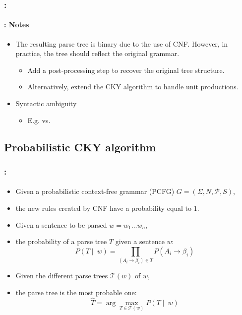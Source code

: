 \documentclass[xcolor=table]{beamer}
\begin{document}
\begin{frame}
	\frametitle{\insertshortsubtitle: \insertsection}
	\framesubtitle{\insertsubsection: Notes}

	\begin{minipage}{.53\textwidth}
	\begin{itemize}
		\item The resulting parse tree is binary due to the use of CNF. 
		However, in practice, the tree should reflect the original grammar.
		\begin{itemize}
			\item Add a post-processing step to recover the original tree structure.
			\item Alternatively, extend the CKY algorithm to handle unit productions.
		\end{itemize}
		\item Syntactic ambiguity
		\begin{itemize}
			\item E.g.  vs. 
		\end{itemize}
	\end{itemize}
	\end{minipage}
	\begin{minipage}{.45\textwidth}
	\end{minipage}

\end{frame}

\subsection{Probabilistic CKY algorithm}

\begin{frame}
	\frametitle{\insertshortsubtitle: \insertsection}
	\framesubtitle{\insertsubsection}

	\begin{itemize}
		\item Given a probabilistic context-free grammar (PCFG) $G = (\Sigma, N, \mathcal{P}, S)$,
		\item the new rules created by CNF have a probability equal to $1$.
		\item Given a sentence to be parsed $w = w_1 \ldots w_n$,
		\item the probability of a parse tree $T$ given a sentence $w$:
		\[P(T \mid\ w) = \prod\limits_{(A_i \rightarrow \beta_i) \in T} P(A_i \rightarrow \beta_i)\]
		\item Given the different parse trees $\mathcal{T}(w)$ of $w$,
		\item the parse tree is the most probable one:
		\[\hat{T} = \arg\max\limits_{T \in \mathcal{T}(w)} P(T \mid\ w)\]
	\end{itemize}

\end{frame}
\end{document}
